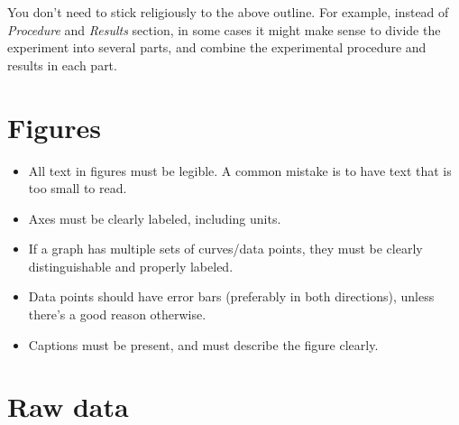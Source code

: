 \documentclass[11pt,a4paper]{article}
\begin{document}
\noindent
You don't need to stick religiously to the above outline.  For
example, instead of \textit{Procedure} and \textit{Results} section,
in some cases it might make sense to divide the experiment into
several parts, and combine the experimental procedure and results in
each part.







\section{Figures}

\begin{itemize}
\item All text in figures must be legible.  A common mistake is to
  have text that is too small to read.

\item Axes must be clearly labeled, including units.

\item If a graph has multiple sets of curves/data points, they must
  be clearly distinguishable and properly labeled.

\item Data points should have error bars (preferably in both
  directions), unless there's a good reason otherwise.

\item Captions must be present, and must describe the figure clearly.
\end{itemize}


\section{Raw data}
\end{document}
